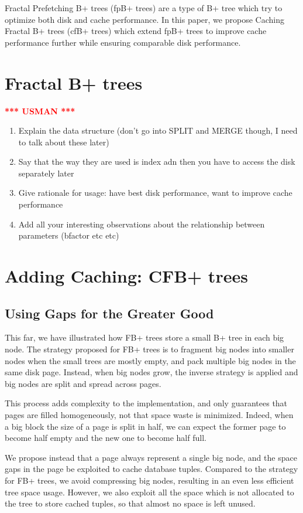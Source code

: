\documentclass{article}
\newcommand{\usman}{\textcolor{Red}{\textbf{*** USMAN ***} }}
\begin{document}
Fractal Prefetching B+ trees (fpB+ trees) are a type of B+ tree which try to optimize both disk and cache performance. In this paper, we propose Caching Fractal B+ trees (cfB+ trees) which extend fpB+ trees to improve cache performance further while ensuring comparable disk performance.

\section{Fractal B+ trees}
\usman
\begin{enumerate}
	\item Explain the data structure (don't go into SPLIT and MERGE though, I need to talk about these later)
	\item Say that the way they are used is index adn then you have to access the disk separately later 
	\item Give rationale for usage: have best disk performance, want to improve cache performance
	\item Add all your interesting observations about the relationship between parameters (bfactor etc etc)
\end{enumerate}


\section{Adding Caching: CFB+ trees}
\subsection{Using Gaps for the Greater Good}
This far, we have illustrated how FB+ trees store a small B+ tree in each big node.
The strategy proposed for FB+ trees is to fragment big nodes into smaller nodes when the small trees
are mostly empty, and pack multiple big nodes in the same disk page.
Instead, when big nodes grow, the inverse strategy is applied and big nodes are split and spread
across pages.

This process adds complexity to the implementation, and only guarantees that pages are filled
homogeneously, not that space waste is minimized.
Indeed, when a big block the size of a page is split in half,
we can expect the former page to become half empty and the new one to become half full.

We propose instead that a page always represent a single big node, and the space gaps in the page
be exploited to cache database tuples.
Compared to the strategy for FB+ trees, we avoid compressing big nodes, resulting in an
even less efficient tree space usage.
However, we also exploit all the space which is not allocated to the tree to store cached tuples,
so that almost no space is left unused.
\end{document}
